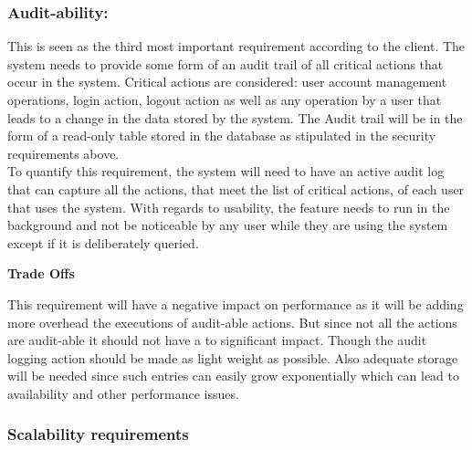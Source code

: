 \vspace{0.1in}

\subsubsection{Audit-ability:}

\begin{flushleft}

This is seen as the third most important requirement according to the client. The system needs to provide some form of an audit trail of all critical actions that occur in the system. Critical actions are considered: user account management operations, login action, logout action as well as any operation by a user that leads to a change in the data stored by the system. The Audit trail will be in the form of a read-only table stored in the database as stipulated in the security requirements above.\\

To quantify this requirement, the system will need to have an active audit log that can capture all the actions, that meet the list of critical actions, of each user that uses the system. With regards to usability, the feature needs to run in the background and not be noticeable by any user while they are using the system except if it is deliberately queried.
\vspace{0.1in}

\textbf{Trade Offs}

This requirement will have a negative impact on performance as it will be adding more overhead the executions of audit-able actions. But since not all the actions are audit-able it should not have a to significant impact. Though the audit logging action should be made as light weight as possible. Also adequate storage will be needed since such entries can easily grow exponentially which can lead to availability and other performance issues.  

\vspace{0.1in}


\end{flushleft}

\subsubsection{Scalability requirements}

